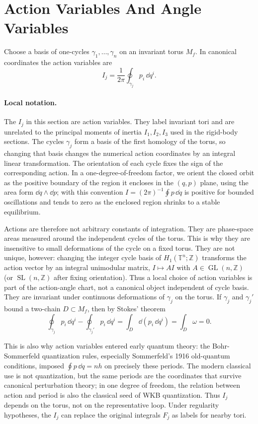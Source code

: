 \section{Action Variables And Angle Variables}
\label{sec:action-angle-variables}

Choose a basis of one-cycles \(\gamma_1,\ldots,\gamma_n\) on an invariant torus
\(M_f\). In canonical coordinates the action variables are
\[
  I_j=\frac{1}{2\pi}\oint_{\gamma_j} p_i\,\dd q^i.
\]

\paragraph{Local notation.}
The \(I_j\) in this section are action variables.  They label invariant tori
and are unrelated to the principal moments of inertia \(I_1,I_2,I_3\) used in
the rigid-body sections.  The cycles \(\gamma_j\) form a basis of the first
homology of the torus, so changing that basis changes the numerical action
coordinates by an integral linear transformation.  The orientation of each
cycle fixes the sign of the corresponding action.  In a one-degree-of-freedom
factor, we orient the closed orbit as the positive boundary of the region it
encloses in the \((q,p)\) plane, using the area form \(\dd q\wedge \dd p\);
with this convention \(I=(2\pi)^{-1}\oint p\,\dd q\) is positive for bounded
oscillations and tends to zero as the enclosed region shrinks to a stable
equilibrium.

Actions are therefore not arbitrary constants of integration. They are
phase-space areas measured around the independent cycles of the torus. This is
why they are insensitive to small deformations of the cycle on a fixed torus.
They are not unique, however: changing the integer cycle basis of
\(H_1(\mathbb T^n;\mathbb Z)\) transforms the action vector by an integral
unimodular matrix, \(I\mapsto AI\) with \(A\in\operatorname{GL}(n,\mathbb Z)\) (or
\(\operatorname{SL}(n,\mathbb Z)\) after fixing orientation). Thus a local choice of action
variables is part of the action-angle chart, not a canonical object independent
of cycle basis.
They are invariant under continuous deformations of \(\gamma_j\) on the torus.
If \(\gamma_j\) and \(\gamma_j'\) bound a two-chain \(D\subset M_f\), then by
Stokes' theorem
\[
  \oint_{\gamma_j}p_i\,\dd q^i
  -
  \oint_{\gamma_j'}p_i\,\dd q^i
  =
  \int_D \dd(p_i\,\dd q^i)
  =
  \int_D \omega
  =
  0.
\]

This is also why action variables entered early quantum theory: the
Bohr-Sommerfeld quantization rules, especially Sommerfeld's 1916 old-quantum
conditions, imposed \(\oint p\,\dd q=nh\) on precisely these periods. The modern
classical use is not quantization, but the same periods are the coordinates that
survive canonical perturbation theory; in one degree of freedom, the relation
between action and period is also the classical seed of WKB quantization.
Thus \(I_j\) depends on the torus, not on the representative loop. Under
regularity hypotheses, the \(I_j\) can replace the original integrals \(F_j\)
as labels for nearby tori.

